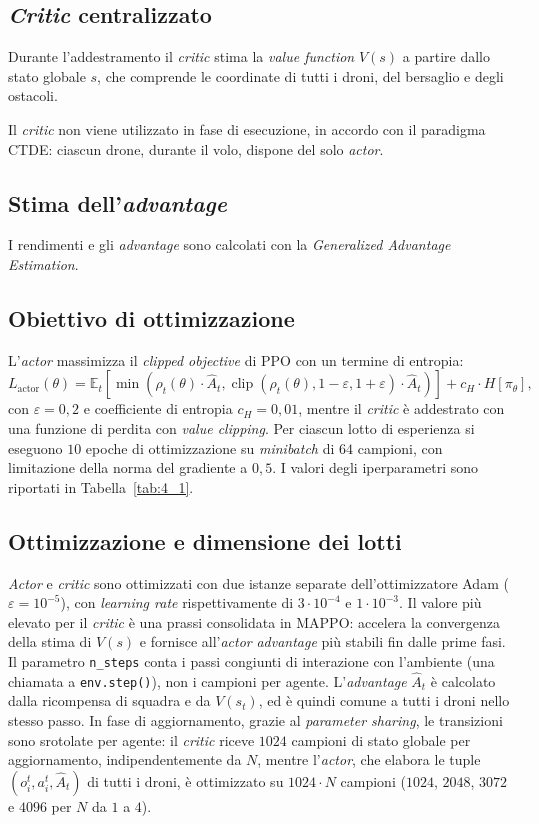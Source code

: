 \documentclass[12pt,a4paper,twoside]{report}
\begin{document}
\subsection{\emph{Critic} centralizzato}
Durante l'addestramento il \emph{critic} stima la \emph{value function} $V(s)$ a partire dallo stato globale $s$, che comprende le coordinate di tutti i droni, del bersaglio e degli ostacoli.

Il \emph{critic} non viene utilizzato in fase di esecuzione, in accordo con il paradigma CTDE: ciascun drone, durante il volo, dispone del solo \emph{actor}.

\subsection{Stima dell'\emph{advantage}}
I rendimenti e gli \emph{advantage} sono calcolati con la \emph{Generalized Advantage Estimation}.

\subsection{Obiettivo di ottimizzazione}
L'\emph{actor} massimizza il \emph{clipped objective} di PPO con un termine di entropia:
\[
L_{\text{actor}}(\theta) = \mathbb{E}_t \left[ \min\left( \rho_t(\theta) \cdot \hat{A}_t , \operatorname{clip}(\rho_t(\theta), 1 - \varepsilon, 1 + \varepsilon) \cdot \hat{A}_t \right) \right] + c_H \cdot H[\pi_\theta],
\]
con $\varepsilon = 0,2$ e coefficiente di entropia $c_H = 0,01$, mentre il \emph{critic} è addestrato con una funzione di perdita con \emph{value clipping}. Per ciascun lotto di esperienza si eseguono $10$ epoche di ottimizzazione su \emph{minibatch} di $64$ campioni, con limitazione della norma del gradiente a $0,5$. I valori degli iperparametri sono riportati in Tabella~\ref{tab:4_1}.

\subsection{Ottimizzazione e dimensione dei lotti}
\emph{Actor} e \emph{critic} sono ottimizzati con due istanze separate dell'ottimizzatore Adam ($\varepsilon = 10^{-5}$), con \emph{learning rate} rispettivamente di $3 \cdot 10^{-4}$ e $1 \cdot 10^{-3}$. Il valore più elevato per il \emph{critic} è una prassi consolidata in MAPPO: accelera la convergenza della stima di $V(s)$ e fornisce all'\emph{actor} \emph{advantage} più stabili fin dalle prime fasi. Il parametro \texttt{n\_steps} conta i passi congiunti di interazione con l'ambiente (una chiamata a \texttt{env.step()}), non i campioni per agente. L'\emph{advantage} $\hat{A}_t$ è calcolato dalla ricompensa di squadra e da $V(s_t)$, ed è quindi comune a tutti i droni nello stesso passo. In fase di aggiornamento, grazie al \emph{parameter sharing}, le transizioni sono srotolate per agente: il \emph{critic} riceve $1024$ campioni di stato globale per aggiornamento, indipendentemente da $N$, mentre l'\emph{actor}, che elabora le tuple $(o_i^t, a_i^t, \hat{A}_t)$ di tutti i droni, è ottimizzato su $1024 \cdot N$ campioni ($1024$, $2048$, $3072$ e $4096$ per $N$ da $1$ a $4$).
\end{document}
